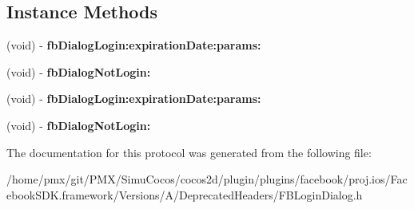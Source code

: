 \subsection*{Instance Methods}
\begin{DoxyCompactItemize}
\item 
\mbox{\label{protocolFBLoginDialogDelegate_01-p_afeb0760f23cfc5f183607f4cca5e45b6}} 
(void) -\/ {\bfseries fb\+Dialog\+Login\+:expiration\+Date\+:params\+:}
\item 
\mbox{\label{protocolFBLoginDialogDelegate_01-p_adf28b9ad4a16d7864fa4b51a50b5a032}} 
(void) -\/ {\bfseries fb\+Dialog\+Not\+Login\+:}
\item 
\mbox{\label{protocolFBLoginDialogDelegate_01-p_afeb0760f23cfc5f183607f4cca5e45b6}} 
(void) -\/ {\bfseries fb\+Dialog\+Login\+:expiration\+Date\+:params\+:}
\item 
\mbox{\label{protocolFBLoginDialogDelegate_01-p_adf28b9ad4a16d7864fa4b51a50b5a032}} 
(void) -\/ {\bfseries fb\+Dialog\+Not\+Login\+:}
\end{DoxyCompactItemize}


The documentation for this protocol was generated from the following file\+:\begin{DoxyCompactItemize}
\item 
/home/pmx/git/\+P\+M\+X/\+Simu\+Cocos/cocos2d/plugin/plugins/facebook/proj.\+ios/\+Facebook\+S\+D\+K.\+framework/\+Versions/\+A/\+Deprecated\+Headers/F\+B\+Login\+Dialog.\+h\end{DoxyCompactItemize}
